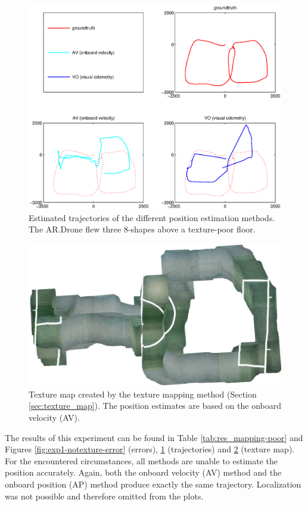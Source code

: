 \begin{figure}[htb!]
\centering
\includegraphics[width=\linewidth,trim=2cm 1.5cm 2cm 1cm]{images/exp1-run2-path.eps}
\caption{Estimated trajectories of the different position estimation methods. The AR.Drone flew three 8-shapes above a texture-poor floor.}
\label{fig:exp1-notexture-path}
\end{figure}

\begin{figure}[htb!]
\centering
\includegraphics[width=0.75\linewidth]{images/exp1-run2-map.jpg}
\caption{Texture map created by the texture mapping method (Section \ref{sec:texture_map}). The position estimates are based on the onboard velocity (AV).}
\label{fig:exp1-notexture-map}
\end{figure}


The results of this experiment can be found in Table \ref{tab:res_mapping-poor} and Figures \ref{fig:exp1-notexture-error} (errors), \ref{fig:exp1-notexture-path} (trajectories) and \ref{fig:exp1-notexture-map} (texture map).
For the encountered circumstances, all methods are unable to estimate the position accurately.
Again, both the onboard velocity (AV) method and the onboard position (AP) method produce exactly the same trajectory.
Localization was not possible and therefore omitted from the plots.

